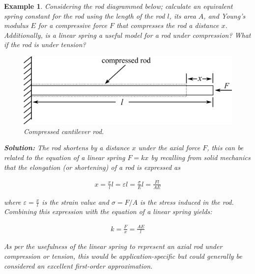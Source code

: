 \documentclass[12pt,letter]{article}
\newtheorem{ex}{Example}
\numberwithin{ex}{section} %
\newenvironment{example}{\begin{mdframed}[middlelinewidth=0.5mm]\begin{ex}\normalfont}{\end{ex}\end{mdframed}}
\numberwithin{re}{section} %
\numberwithin{vcs}{section} %
\begin{document}
			\begin{example}
    			
    			Considering the rod diagrammed below; calculate an equivalent spring constant for the rod using the length of the rod $l$, its area $A$, and Young's modulus $E$ for a compressive force $F$ that compresses the rod a distance $x$. Additionally, is a linear spring a useful model for a rod under compression? What if the rod is under tension?
        
		 		\begin{figure}[H]
		 			\centering
		 			\includegraphics[]{../figures/compressed_cantilever_rod.png}
		 			\caption{Compressed cantilever rod. }
		 		\end{figure}	   
       
			    \textbf{Solution:} The rod shortens by a distance $x$ under the axial force $F$, this can be related to the equation of a linear spring $F=kx$ by recalling from solid mechanics that the elongation (or shortening) of a rod is expressed as 
			
			    \begin{eqnarray}
			    x=\frac{x}{l}l=\varepsilon l = \frac{\sigma}{E}l = \frac{Fl}{AE}
			    \end{eqnarray}    
			    
			    where  $\varepsilon = \frac{x}{l}$ is the strain value and $\sigma = F/A$ is the stress induced in the rod. Combining this expression with the equation of a linear spring yields:
			    
			    \begin{eqnarray}
			    k = \frac{F}{x}= \frac{AE}{l}
			    \end{eqnarray}     
			   
			    As per the usefulness of the linear spring to represent an axial rod under compression or tension, this would be application-specific but could generally be considered an excellent first-order approximation.  
			
			\end{example}
\end{document}

